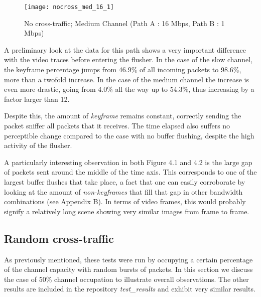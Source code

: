 \begin{figure}[!ht]
\caption{No cross-traffic; Medium Channel (Path A : 16 Mbps, Path B : 1 Mbps)}
\centering
\texttt{[image: nocross\_med\_16\_1]}
\end{figure}

A preliminary look at the data for this path shows a very important difference with the video traces before entering the flusher. In the case of the slow channel, the keyframe percentage jumps from 46.9\% of all incoming packets to 98.6\%, more than a twofold increase. In the case of the medium channel the increase is even more drastic, going from 4.0\% all the way up to 54.3\%, thus increasing by a factor larger than 12.

Despite this, the amount of \textit{keyframe} remains constant, correctly sending the packet sniffer all packets that it receives. The time elapsed also suffers no perceptible change compared to the case with no buffer flushing, despite the high activity of the flusher.

A particularly interesting observation in both Figure 4.1 and 4.2 is the large gap of packets sent around the middle of the time axis. This corresponds to one of the largest buffer flushes that take place, a fact that one can easily corroborate by looking at the amount of \textit{non-keyframes} that fill that gap in other bandwidth combinations (see Appendix B). In terms of video frames, this would probably signify a relatively long scene showing very similar images from frame to frame.

\clearpage

\subsection{Random cross-traffic}

As previously mentioned, these tests were run by occupying a certain percentage of the channel capacity with random bursts of packets. In this section we discuss the case of 50\% channel occupation to illustrate overall observations. The other results are included in the repository \textit{test\_results} and exhibit very similar results.

